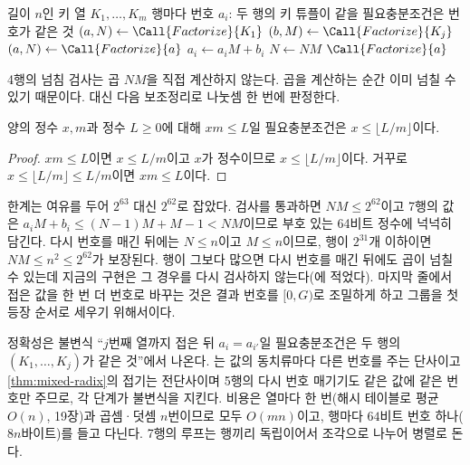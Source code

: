 \begin{algorithm}[htbp]
\begin{algorithmic}[1]
\Require 길이 $n$인 키 열 $K_1,\dots,K_m$
\Ensure 행마다 번호 $a_i$: 두 행의 키 튜플이 같을 필요충분조건은 번호가 같은 것
\State $(a,N)\gets\Call{Factorize}{K_1}$ \Comment{$a_i\in[0,N)$, 첫 등장 순서의 번호}
  \State $(b,M)\gets\Call{Factorize}{K_j}$
   
    \State $(a,N)\gets\Call{Factorize}{a}$ 
  \EndIf
   $a_i\gets a_iM+b_i$ 
  \EndFor
  \State $N\gets NM$
\EndFor
\State \Return $\Call{Factorize}{a}$ 
\end{algorithmic}
\caption{여러 키 열을 하나의 번호로 접기 (stardust )}
\label{alg:fold-keys}
\end{algorithm}

4행의 넘침 검사는 곱 $NM$을 직접 계산하지 않는다. 곱을 계산하는 순간 이미 넘칠 수 있기 때문이다. 대신 다음 보조정리로 나눗셈 한 번에 판정한다.

\begin{lemma}
\label{lem:mul-guard}
양의 정수 $x,m$과 정수 $L\ge0$에 대해 $xm\le L$일 필요충분조건은 $x\le\lfloor L/m\rfloor$이다.
\end{lemma}

\begin{proof}
$xm\le L$이면 $x\le L/m$이고 $x$가 정수이므로 $x\le\lfloor L/m\rfloor$이다. 거꾸로 $x\le\lfloor L/m\rfloor\le L/m$이면 $xm\le L$이다.
\end{proof}

한계는 여유를 두어 $2^{63}$ 대신 $2^{62}$로 잡았다. 검사를 통과하면 $NM\le2^{62}$이고 7행의 값은 $a_iM+b_i\le(N-1)M+M-1<NM$이므로 부호 있는 64비트 정수에 넉넉히 담긴다. 다시 번호를 매긴 뒤에는 $N\le n$이고 $M\le n$이므로, 행이 $2^{31}$개 이하이면 $NM\le n^2\le2^{62}$가 보장된다. 행이 그보다 많으면 다시 번호를 매긴 뒤에도 곱이 넘칠 수 있는데 지금의 구현은 그 경우를 다시 검사하지 않는다(에 적었다). 마지막 줄에서 접은 값을 한 번 더 번호로 바꾸는 것은 결과 번호를 $[0,G)$로 조밀하게 하고 그룹을 첫 등장 순서로 세우기 위해서이다.

정확성은 불변식 ``$j$번째 열까지 접은 뒤 $a_i=a_{i'}$일 필요충분조건은 두 행의 $(K_1,\dots,K_j)$가 같은 것''에서 나온다. 는 값의 동치류마다 다른 번호를 주는 단사이고 \cref{thm:mixed-radix}의 접기는 전단사이며 5행의 다시 번호 매기기도 같은 값에 같은 번호만 주므로, 각 단계가 불변식을 지킨다. 비용은 열마다  한 번(해시 테이블로 평균 $O(n)$, 19장)과 곱셈·덧셈 $n$번이므로 모두 $O(mn)$이고, 행마다 $64$비트 번호 하나($8n$바이트)를 들고 다닌다. 7행의 루프는 행끼리 독립이어서 조각으로 나누어 병렬로 돈다.

